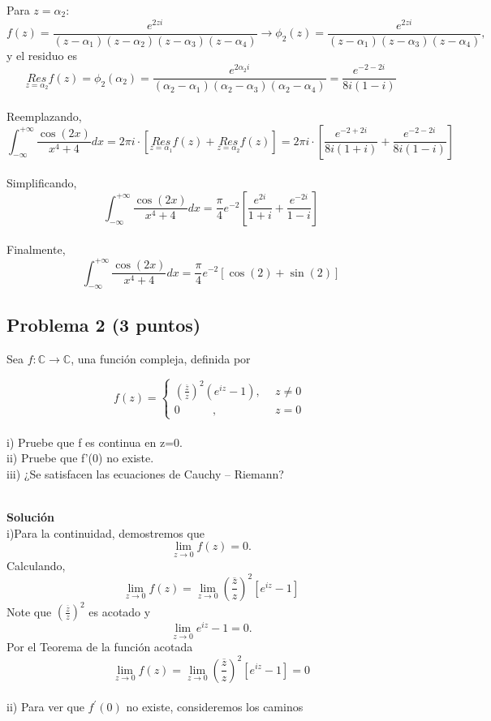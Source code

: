 \documentclass[a4paper,12pt]{article}
\begin{document}
Para $z = \alpha_{2}$:
\[
f(z) = \frac{e^{2zi}}{\left( z - \alpha_{1} \right)\left( z - \alpha_{2} \right)\left( z - \alpha_{3} \right)\left( z - \alpha_{4} \right)} \rightarrow \phi_{2}(z) = \frac{e^{2zi}}{\left( z - \alpha_{1} \right)\left( z - \alpha_{3} \right)\left( z - \alpha_{4} \right)},
\]
y el residuo es
\[
\underset{z = \alpha_{2}}{Res}{f(z)} = \phi_{2}\left( \alpha_{2} \right) = \frac{e^{2\alpha_{2}i}}{\left( \alpha_{2} - \alpha_{1} \right)\left( \alpha_{2} - \alpha_{3} \right)\left( \alpha_{2} - \alpha_{4} \right)} = \frac{e^{- 2 - 2i}}{8i(1 - i)}
\]\\
Reemplazando,
\[
\int_{- \infty}^{+ \infty}\frac{\cos(2x)}{x^{4} + 4}dx = 2\pi i \cdot \left\lbrack \underset{z = \alpha_{1}}{Res}{f(z)} + \underset{z = \alpha_{2}}{Res}{f(z)} \right\rbrack = 2\pi i \cdot \left\lbrack \frac{e^{- 2 + 2i}}{8i(1 + i)} + \frac{e^{- 2 - 2i}}{8i(1 - i)} \right\rbrack
\]\\
Simplificando,
\[
\int_{- \infty}^{+ \infty}\frac{\cos(2x)}{x^{4} + 4}dx = \frac{\pi}{4}e^{- 2}\left\lbrack \frac{e^{2i}}{1 + i} + \frac{e^{- 2i}}{1 - i} \right\rbrack
\]\\
Finalmente,
\[
\int_{- \infty}^{+ \infty}\frac{\cos\left( 2x \right)}{x^{4} + 4}dx = \frac{\pi}{4}e^{- 2}\left\lbrack \cos\left( 2 \right) + \sin\left( 2 \right) \right\rbrack
\]

\subsection*{Problema 2 (3 puntos)}

Sea $f\mathbb{:C \rightarrow C}$, una función compleja, definida por

\[
f(z) = \left\{ \begin{aligned}
\left( \frac{\overline{z}}{z} \right)^{2}( e^{iz} - 1) ,\ \  & z \neq 0 \\
0\ \ \ \ \ \ \ \ \ \ \ \ \ ,\ \  & z = 0
\end{aligned} \right.\ 
\]\\
i) Pruebe que f es continua en z=0.\\
ii) Pruebe que f'(0) no existe.\\
iii) ¿Se satisfacen las ecuaciones de Cauchy – Riemann?

\\
\textbf{Solución}\\
i)Para la continuidad, demostremos que
\[
\lim_{z \rightarrow 0}{f(z)} = 0.
\]
Calculando,
\[
\lim_{z \rightarrow 0}{f(z)} = \lim_{z \rightarrow 0}{\left( \frac{\overline{z}}{z} \right)^{2}\left\lbrack e^{iz} - 1 \right\rbrack}
\]
Note que $\left( \frac{\overline{z}}{z} \right)^{2}$ es acotado y
\[
\lim_{z \rightarrow 0}{e^{iz} - 1} = 0.
\]
Por el Teorema de la función acotada
\[
\lim_{z \rightarrow 0}{f(z)} = \lim_{z \rightarrow 0}{\left( \frac{\overline{z}}{z} \right)^{2}\left\lbrack e^{iz} - 1 \right\rbrack} = 0
\]\\
ii) Para ver que $f^{'}(0)$ no existe, consideremos los caminos
\end{document}
